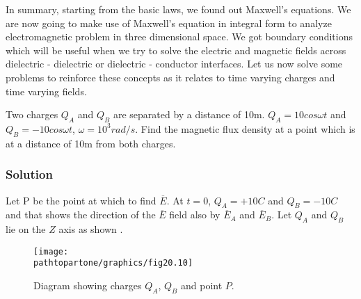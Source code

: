 In summary, starting from the basic laws, we found out Maxwell's equations. We are now going to make use of Maxwell's equation in integral form to analyze electromagnetic problem in three dimensional space. We got boundary conditions which will be useful when we try to solve the electric and magnetic fields across dielectric - dielectric or dielectric - conductor interfaces. Let us now solve some problems to reinforce these concepts as it relates to time varying charges and time varying fields.
\begin{exmp}
Two charges $Q_A$ and $Q_B$ are separated by a distance of 10m. $Q_A = 10cos\omega t$ and $Q_B = -10cos\omega t$, $\omega = 10^3 rad/s$. Find the magnetic flux density at a point which is at a distance of 10m from both charges.

\subsubsection*{Solution}
Let P be the point at which to find $\overline{E}$. At $t = 0$, $Q_A = +10C$ and $Q_B = -10C$ and that shows the direction of the $\overline{E}$ field also by $\overline{E}_{A}$ and $\overline{E}_{B}$. Let $Q_A$ and $Q_B$ lie on the $Z$ axis as shown .
\begin{figure}[h]
\centering
\texttt{[image: \\pathtopartone/graphics/fig20.10]}
\caption{Diagram showing charges $Q_A$, $Q_B$ and point $P$.}
\end{figure}


\end{exmp}
